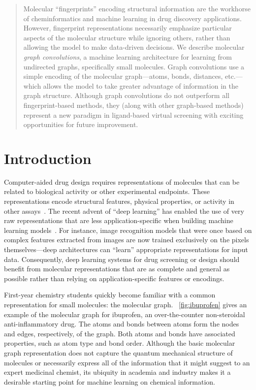 

\begin{abstract}

Molecular ``fingerprints'' encoding structural information are the workhorse of
cheminformatics and machine learning in drug discovery applications. However,
fingerprint representations necessarily emphasize particular aspects of the
molecular structure while ignoring others, rather than allowing the model to
make data-driven decisions. We describe molecular \emph{graph convolutions}, a
machine learning architecture for learning from undirected
graphs, specifically small molecules. Graph convolutions use a simple encoding
of the molecular graph---atoms, bonds, distances, etc.---which allows the model to
take greater advantage of information in the graph structure.
Although graph convolutions do not outperform all fingerprint-based methods,
they (along with other graph-based methods) represent a new paradigm in
ligand-based virtual screening with exciting opportunities for future
improvement.



\end{abstract}

\section{Introduction}\label{sec:intro}

Computer-aided drug design requires representations of molecules that can be
related to biological activity or other experimental endpoints. These
representations encode structural features, physical properties, or activity in
other assays~\citep{todeschini2009molecular, petrone2012rethinking}. The recent
advent of ``deep learning'' has enabled the use of very raw representations that
are less application-specific when building machine learning
models~\citep{lecun2015deep}. For instance, image recognition models that were
once based on complex features extracted from images are now trained exclusively
on the pixels themselves---deep architectures can ``learn'' appropriate
representations for input data. Consequently, deep learning systems for drug
screening or design should benefit from molecular representations that are as
complete and general as possible rather than relying on application-specific
features or encodings.

First-year chemistry students quickly become familiar with a common
representation for small molecules: the molecular graph.
\figurename~\ref{fig:ibuprofen} gives an example of the molecular graph for
ibuprofen, an over-the-counter non-steroidal anti-inflammatory drug. The
atoms and bonds between atoms form the nodes and edges, respectively, of the
graph. Both atoms and bonds have associated properties, such as atom type
and bond order. Although the basic molecular graph representation does not
capture the quantum mechanical structure of molecules or necessarily express all
of the information that it might suggest to an expert medicinal chemist, its
ubiquity in academia and industry makes it a desirable starting point for
machine learning on chemical information.

